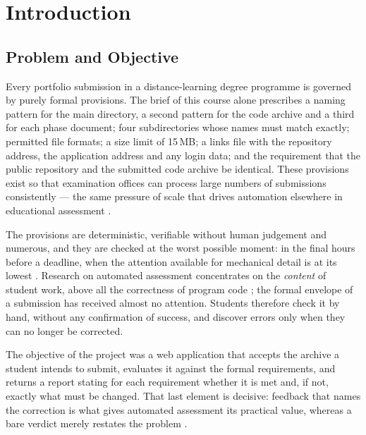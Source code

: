 \documentclass[a4paper,11pt]{article}
\begin{document}
\setcounter{page}{1}

\section{Introduction}\label{sec:intro}

\subsection{Problem and Objective}\label{sec:problem}

Every portfolio submission in a distance-learning degree programme is governed by
purely formal provisions. The brief of this course alone prescribes a naming
pattern for the main directory, a second pattern for the code archive and a third
for each phase document; four subdirectories whose names must match exactly;
permitted file formats; a size limit of 15\,MB; a links file with the repository
address, the application address and any login data; and the requirement that
the public repository and the submitted code archive be identical. These
provisions exist so that examination offices can process large numbers of
submissions consistently --- the same pressure of scale that drives automation
elsewhere in educational assessment \citep{Paiva2022}.

The provisions are deterministic, verifiable without human judgement and
numerous, and they are checked at the worst possible moment: in the final hours
before a deadline, when the attention available for mechanical detail is at its
lowest \citep{Hermans2021}. Research on automated assessment concentrates on
the \textit{content} of student work, above all the correctness of program code
\citep{Messer2024, Combefis2022}; the formal envelope of a submission has
received almost no attention. Students therefore check it by hand, without any
confirmation of success, and discover errors only when they can no longer be
corrected.

The objective of the project was a web application that accepts the archive a
student intends to submit, evaluates it against the formal requirements, and
returns a report stating for each requirement whether it is met and, if not,
exactly what must be changed. That last element is decisive: feedback that names
the correction is what gives automated assessment its practical value, whereas a
bare verdict merely restates the problem \citep{Combefis2022}.
\end{document}
